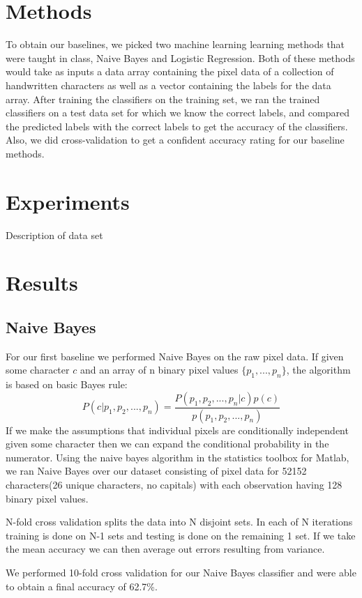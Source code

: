 \documentclass{article} %
\begin{document}
\section{Methods}
To obtain our baselines, we picked two machine learning learning methods that were taught in class, Naive Bayes and Logistic Regression. Both of these methods would take as inputs a data array containing the pixel data of a collection of handwritten characters as well as a vector containing the labels for the data array. After training the classifiers on the training set, we ran the trained classifiers on a test data set for which we know the correct labels, and compared the predicted labels with the correct labels to get the accuracy of the classifiers. Also, we did cross-validation to get a confident accuracy rating for our baseline methods. 

\section{Experiments}
Description of data set

\section{Results}
\subsection{Naive Bayes}
For our first baseline we performed Naive Bayes on the raw pixel data.
If given some character $c$ and an array of n binary pixel values $\{p_1, ..., p_n\}$, the algorithm is based on basic Bayes rule:
$$P(c|p_1, p_2, ... , p_n) = \frac{P(p_1, p_2, ... , p_n|c)p(c)}{p(p_1, p_2, ... , p_n)}$$
If we make the assumptions that individual pixels are conditionally independent given some character then we can expand the conditional probability in the numerator. Using the naive bayes algorithm in the statistics toolbox for Matlab, we ran Naive Bayes over our dataset consisting of pixel data for 52152 characters(26 unique characters, no capitals) with each observation having 128 binary pixel values.

N-fold cross validation splits the data into N disjoint sets. In each of N iterations training is done on N-1 sets and testing is done on the remaining 1 set. If we take the mean accuracy we can then average out errors resulting from variance.

We performed 10-fold cross validation for our Naive Bayes classifier and were able to obtain a final accuracy of 62.7\%.
\end{document}
